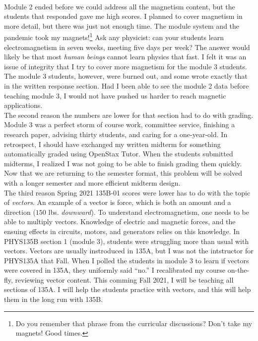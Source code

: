 \documentclass[../../main.tex]{subfiles}
\begin{document}
\\
\vspace{0.15cm}
Module 2 ended before we could address all the magnetism content, but the students that responded gave me high scores.  I planned to cover magnetism in more detail, but there was just not enough time.  The module system and the pandemic took my magnets!\footnote{Do you remember that phrase from the curricular discussions?  Don't take my magnets!  Good times.}  Ask any physicist: can your students learn electromagnetism in seven weeks, meeting five days per week?  The answer would likely be that most \textit{human beings} cannot learn physics that fast.  I felt it was an issue of integrity that I try to cover more magnetism for the module 3 students.  The module 3 students, however, were burned out, and some wrote exactly that in the written response section.  Had I been able to see the module 2 data before teaching module 3, I would not have pushed us harder to reach magnetic applications.
\\
\vspace{0.15cm}
The second reason the numbers are lower for that section had to do with grading.  Module 3 was a perfect storm of course work, committee service, finishing a research paper, advising thirty students, and caring for a one-year-old.  In retrospect, I should have exchanged my written midterm for something automatically graded using OpenStax Tutor.  When the students submitted midterms, I realized I was not going to be able to finish grading them quickly.  Now that we are returning to the semester format, this problem will be solved with a longer semester and more efficient midterm design.
\\
\vspace{0.15cm}
The third reason Spring 2021 135B-01 scores were lower has to do with the topic of \textit{vectors}.  An example of a vector is force, which is both an amount and a direction ($150$ lbs. \textit{downward}).  To understand electromagnetism, one needs to be able to multiply vectors.  Knowledge of electric and magnetic forces, and the ensuing effects in circuits, motors, and generators relies on this knowledge.  In PHYS135B section 1 (module 3), students were struggling more than usual with vectors.  Vectors are usually instroduced in 135A, but I was not the intstructor for PHYS135A that Fall.  When I polled the students in module 3 to learn if vectors were covered in 135A, they uniformly said ``no.''  I recalibrated my course on-the-fly, reviewing vector content.  This comming Fall 2021, I will be teaching all sections of 135A.  I will help the students practice with vectors, and this will help them in the long run with 135B.
\end{document}
